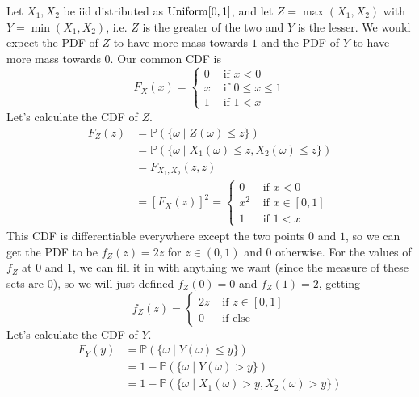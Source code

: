   \begin{example}[Uniforms]
    \label{ex:uniforms}
    Let $X_1, X_2$ be iid distributed as $\operatorname{Uniform}[0, 1]$, and let $Z = \max(X_1, X_2)$ with $Y = \min(X_1, X_2)$, i.e. $Z$ is the greater of the two and $Y$ is the lesser. We would expect the PDF of $Z$ to have more mass towards $1$ and the PDF of $Y$ to have more mass towards $0$. Our common CDF is 
    \begin{equation}
      F_{X} (x) = \begin{cases} 0 & \text{ if } x < 0 \\
      x & \text{ if } 0 \leq x \leq 1 \\
      1 & \text{ if } 1 < x \end{cases}
    \end{equation}
    Let's calculate the CDF of $Z$. 
    \begin{align*}
      F_{Z} (z) & = \mathbb{P}(\{\omega \mid Z(\omega) \leq z\}) \\
      & = \mathbb{P}(\{ \omega \mid X_1 (\omega) \leq z, X_2 (\omega) \leq z\}) \\
      & = F_{X_1, X_2} (z, z) \\
      & = [F_{X} (z)]^2 = \begin{cases} 0 & \text{ if } x < 0 \\
      x^2 & \text{ if } x \in [0, 1] \\
      1 & \text{ if } 1 < x \end{cases}
    \end{align*}
    This CDF is differentiable everywhere except the two points $0$ and $1$, so we can get the PDF to be $f_Z (z) = 2 z$ for $z \in (0, 1)$ and $0$ otherwise. For the values of $f_Z$ at $0$ and $1$, we can fill it in with anything we want (since the measure of these sets are $0$), so we will just defined $f_Z (0) = 0$ and $f_Z(1) = 2$, getting 
    \begin{equation}
      f_Z (z) = \begin{cases} 2 z & \text{ if } z \in [0, 1] \\
      0 & \text{ if else} \end{cases}
    \end{equation}
    Let's calculate the CDF of $Y$. 
    \begin{align*}
      F_{Y} (y) & = \mathbb{P}(\{ \omega \mid Y(\omega) \leq y\}) \\
      & = 1 - \mathbb{P}(\{ \omega \mid Y(\omega) > y\}) \\
      & = 1 - \mathbb{P}(\{\omega \mid X_1 (\omega) > y, X_2 (\omega) > y \}) \\

\end{align*}
\end{example}
